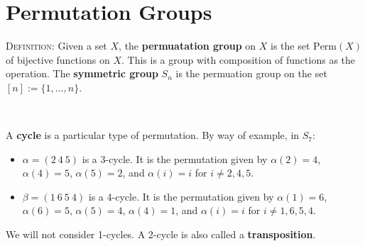 \documentclass[12pt]{amsart}
\newcommand{\showsol}[1]{\def\displaysol{#1}}
\begin{document}
\showsol{0}
	
	\thispagestyle{empty}
	
	\section*{Permutation Groups}
	
	

\begin{framed}

\textsc{Definition:} Given a set $X$, the \textbf{permuatation group} on $X$ is the set $\mathrm{Perm}(X)$ of bijective functions on $X$. This is a group with composition of functions as the operation. The \textbf{symmetric group} $S_n$ is the permuation group on the set $[n]:= \{1,\dots,n\}$. %

\

 A \textbf{cycle} is a particular type of permutation. By way of example, in $S_7$:
 \begin{itemize}
 \item  $\alpha = (2 \ 4 \ 5)$ is a 3-cycle. It is the permutation given by $\alpha(2)=4$, $\alpha(4)=5$, $\alpha(5)=2$, and $\alpha(i)= i$ for $i\neq 2,4,5$.
 \item $\beta = (1 \ 6 \ 5 \ 4)$ is a 4-cycle. It is the permutation given by $\alpha(1)=6$, $\alpha(6)=5$, $\alpha(5)=4$, $\alpha(4)=1$, and $\alpha(i)= i$ for $i\neq 1,6,5,4$.
 \end{itemize}
 We will not consider 1-cycles. A 2-cycle is also called a \textbf{transposition}. 
\end{framed}
\end{document}
